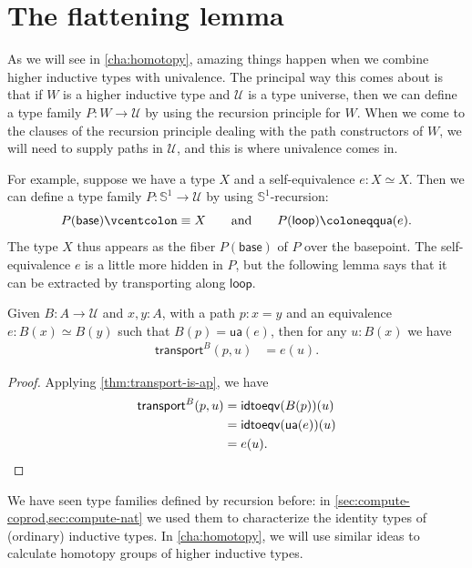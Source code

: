 \documentclass[10pt,a4paper]{article}
\newcommand{\defeq}{\vcentcolon\equiv}  %
\newcommand{\defid}{\coloneqq}
\newcommand{\transfib}[3]{\ensuremath{\mathsf{transport}^{#1}(#2,#3)\xspace}}
\newcommand{\map}[2]{\ensuremath{{#1}\mathopen{}\left({#2}\right)\mathclose{}}\xspace}
\let\ap\map
\newcommand{\eqv}[2]{\ensuremath{#1 \simeq #2}\xspace}
\newcommand{\UU}{\ensuremath{\mathcal{U}}\xspace}
\let\type\UU
\newcommand{\ua}{\ensuremath{\mathsf{ua}}\xspace} %
\newcommand{\idtoeqv}{\ensuremath{\mathsf{idtoeqv}}\xspace}
\newcommand{\Sn}{\mathbb{S}}
\newcommand{\base}{\ensuremath{\mathsf{base}}\xspace}
\newcommand{\lloop}{\ensuremath{\mathsf{loop}}\xspace}
\theoremstyle{definition}
\theoremstyle{remark}
\numberwithin{equation}{section}
\begin{document}
\section{The flattening lemma}
\label{sec:flattening}

As we will see in \cref{cha:homotopy}, amazing things happen when we combine higher inductive types with univalence.
The principal way this comes about is that if $W$ is a higher inductive type and \UU is a type universe, then we can define a type family $P:W\to \UU$ by using the recursion principle for $W$.
When we come to the clauses of the recursion principle dealing with the path constructors of $W$, we will need to supply paths in \UU, and this is where univalence comes in.

For example, suppose we have a type $X$ and a self-equivalence $e:\eqv X X$.
Then we can define a type family $P:\Sn^1 \to \UU$ by using $\Sn^1$-recursion:
\begin{equation*}
  P(\base) \defeq X
  \qquad\text{and}\qquad
  \ap P\lloop \defid \ua(e).
\end{equation*}
The type $X$ thus appears as the fiber $P(\base)$ of $P$ over the basepoint.
The self-equivalence $e$ is a little more hidden in $P$, but the following lemma says that it can be extracted by transporting along \lloop.


\begin{lem}\label{thm:transport-is-given}
  Given $B:A\to\type$ and $x,y:A$, with a path $p:x=y$ and an equivalence $e:\eqv{B(x)}{B(y)}$ such that $\ap{B}p = \ua(e)$, then for any $u:B(x)$ we have
  \begin{align*}
    \transfib{B}{p}{u} &= e(u).
  \end{align*}
\end{lem}
\begin{proof}
  Applying \cref{thm:transport-is-ap}, we have
  \begin{align*}
    \transfib{B}{p}{u} &= \idtoeqv(\ap{B}p)(u)\\
    &= \idtoeqv(\ua(e))(u)\\
    &= e(u).\qedhere
  \end{align*}
\end{proof}

We have seen type families defined by recursion before: in \cref{sec:compute-coprod,sec:compute-nat} we used them to characterize the identity types of (ordinary) inductive types.
In \cref{cha:homotopy}, we will use similar ideas to calculate homotopy groups of higher inductive types.
\end{document}
